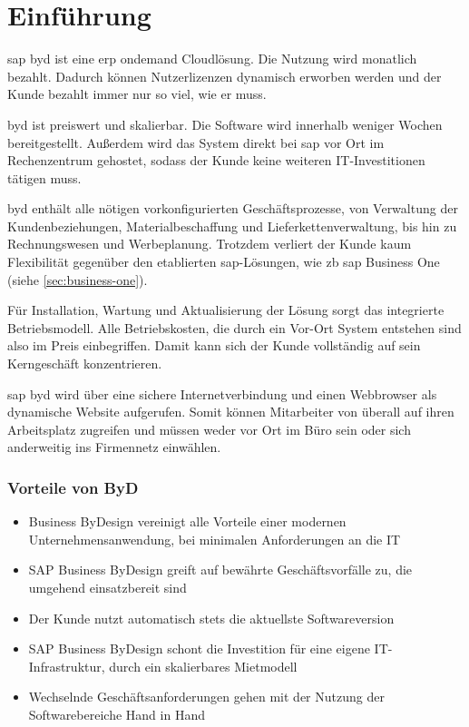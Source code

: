 \section{Einführung}

\gls{sap} \gls{byd} ist eine \gls{erp} \gls{ondemand} Cloudlösung. Die Nutzung wird monatlich bezahlt. Dadurch können Nutzerlizenzen dynamisch erworben werden und der Kunde bezahlt immer nur so viel, wie er muss.

\gls{byd} ist preiswert und skalierbar. Die Software wird innerhalb weniger Wochen bereitgestellt. Außerdem wird das System direkt bei \gls{sap} vor Ort im Rechenzentrum gehostet, sodass der Kunde keine weiteren IT-Investitionen tätigen muss.

\gls{byd} enthält alle nötigen vorkonfigurierten Geschäftsprozesse, von Verwaltung der Kundenbeziehungen, Materialbeschaffung und Lieferkettenverwaltung, bis hin zu Rechnungswesen und Werbeplanung. Trotzdem verliert der Kunde kaum Flexibilität gegenüber den etablierten \gls{sap}-Lösungen, wie \gls{zb} \gls{sap} Business One (siehe \ref{sec:business-one}).

Für Installation, Wartung und Aktualisierung der Lösung sorgt das integrierte Betriebsmodell. Alle Betriebskosten, die durch ein Vor-Ort System entstehen sind also im Preis einbegriffen. Damit kann sich der Kunde vollständig auf sein Kerngeschäft konzentrieren.

\gls{sap} \gls{byd} wird über eine sichere Internetverbindung und einen Webbrowser als dynamische Website aufgerufen. Somit können Mitarbeiter von überall auf ihren Arbeitsplatz zugreifen und müssen weder vor Ort im Büro sein oder sich anderweitig ins Firmennetz einwählen.

\subsubsection{Vorteile von ByD}

\begin{itemize}
\item Business ByDesign vereinigt alle Vorteile einer modernen Unternehmensanwendung, bei minimalen Anforderungen an die IT
\item SAP Business ByDesign greift auf bewährte Geschäftsvorfälle zu, die umgehend einsatzbereit sind
\item Der Kunde nutzt automatisch stets die aktuellste Softwareversion
\item SAP Business ByDesign schont die Investition für eine eigene IT-Infrastruktur, durch ein skalierbares Mietmodell
\item Wechselnde Geschäftsanforderungen gehen mit der Nutzung der Softwarebereiche Hand in Hand
\end{itemize}
\cite{itelligence}

